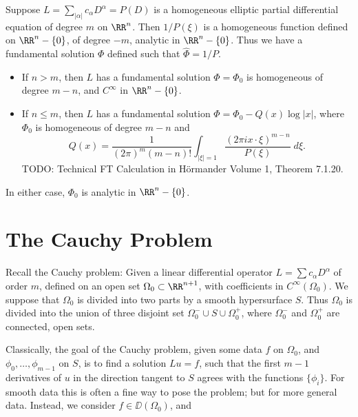 \begin{example}
    Suppose $L = \sum_{|\alpha|} c_\alpha D^\alpha = P(D)$ is a homogeneous elliptic partial differential equation of degree $m$ on $\RR^n$. Then $1/P(\xi)$ is a homogeneous function defined on $\RR^n - \{ 0 \}$, of degree $-m$, analytic in $\RR^n - \{ 0 \}$. Thus we have a fundamental solution $\Phi$ defined such that $\widehat{\Phi} = 1/P$.
    \begin{itemize}
        \item If $n > m$, then $L$ has a fundamental solution $\Phi = \Phi_0$ is homogeneous of degree $m-n$, and $C^\infty$ in $\RR^n - \{ 0 \}$.

        \item If $n \leq m$, then $L$ has a fundamental solution $\Phi = \Phi_0 - Q(x) \log |x|$, where $\Phi_0$ is homogeneous of degree $m - n$ and
        \[ Q(x) = \frac{1}{(2\pi)^m (m-n)!} \int_{|\xi| = 1} \frac{(2\pi i x \cdot \xi)^{m-n}}{P(\xi)}\; d\xi. \]
        TODO: Technical FT Calculation in H\"{o}rmander Volume 1, Theorem 7.1.20.
    \end{itemize}
    In either case, $\Phi_0$ is analytic in $\RR^n - \{ 0 \}$.
\end{example}








\section{The Cauchy Problem}

Recall the Cauchy problem: Given a linear differential operator $L = \sum c_\alpha D^\alpha$ of order $m$, defined on an open set $\Omega_0 \subset \RR^{n+1}$, with coefficients in $C^\infty(\Omega_0)$. We suppose that $\Omega_0$ is divided into two parts by a smooth hypersurface $S$. Thus $\Omega_0$ is divided into the union of three disjoint set $\Omega_0^- \cup S \cup \Omega_0^+$, where $\Omega_0^-$ and $\Omega_0^+$ are connected, open sets.

Classically, the goal of the Cauchy problem, given some data $f$ on $\Omega_0$, and $\phi_0,\dots,\phi_{m-1}$ on $S$, is to find a solution $Lu = f$, such that the first $m-1$ derivatives of $u$ in the direction tangent to $S$ agrees with the functions $\{ \phi_i \}$. For smooth data this is often a fine way to pose the problem; but for more general data. Instead, we consider $f \in \DD(\Omega_0)$, and 

